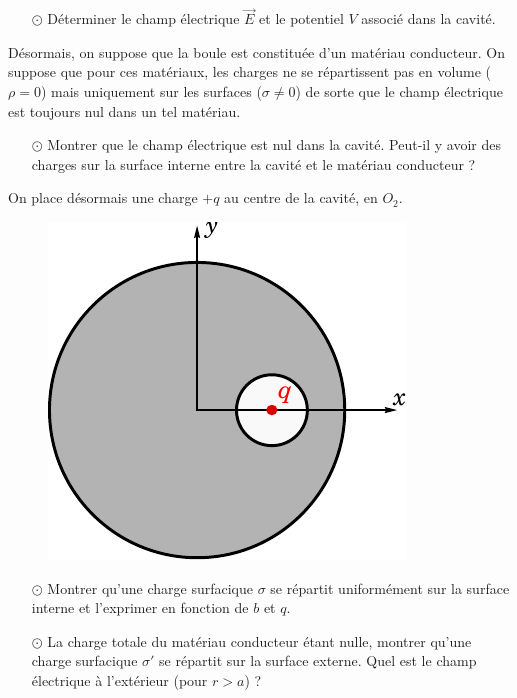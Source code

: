 \documentclass{report}
\begin{document}
\begin{itemize}

	\item[$\odot$] Déterminer le champ électrique $\vec{E}$ et le potentiel $V$ associé dans la cavité.

\end{itemize}

Désormais, on suppose que la boule est constituée d'un matériau conducteur. On suppose que pour ces matériaux, les charges ne se répartissent pas en volume ($\rho=0$) mais uniquement sur les surfaces ($\sigma\neq0$) de sorte que le champ électrique est toujours nul dans un tel matériau. 

\begin{itemize}

	\item[$\odot$] Montrer que le champ électrique est nul dans la cavité. Peut-il y avoir des charges sur la surface interne entre la cavité et le matériau conducteur ?
	
\end{itemize}

On place désormais une charge $+q$ au centre de la cavité, en $O_2$. 

\begin{figure}[h!]
\centering
		\includegraphics[scale=0.7]{em_cavite2.pdf}
\end{figure}

\begin{itemize}
	
	\item[$\odot$] Montrer qu'une charge surfacique $\sigma$ se répartit uniformément sur la surface interne et l'exprimer en fonction de $b$ et $q$.
	
	\item[$\odot$] La charge totale du matériau conducteur étant nulle, montrer qu'une charge surfacique $\sigma'$ se répartit sur la surface externe. Quel est le champ électrique à l'extérieur (pour $r>a$) ? 

\end{itemize}
\end{document}

